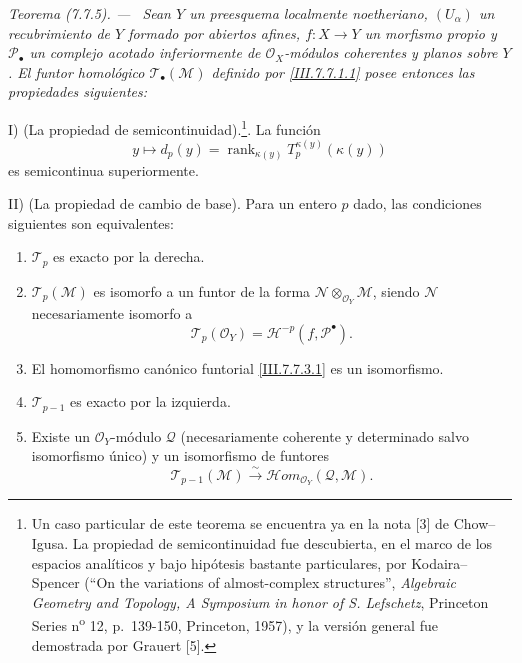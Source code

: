 \documentclass[10pt,oneside]{book}
\newcommand{\kres}{\kappa}
\newcommand{\oldpage}[2][]{\setcounter{footnote}{0}\marginpar{\scriptsize\textbf{#1}~|~#2}\ignorespaces}
\newenvironment{theorem}[1][]{\par\medskip\noindent\itshape Teorema (#1). ---\ }{\par}
\begin{document}
\begin{theorem}[7.7.5]
\label{III.7.7.5}
Sean $Y$ un preesquema localmente noetheriano, $(U_\alpha)$ un recubrimiento
de $Y$ formado por abiertos afines, $f:X\to Y$ un morfismo propio y
$\mathscr P_\bullet$ un complejo acotado inferiormente de
$\mathscr O_X$-módulos coherentes y planos sobre $Y$. El funtor homológico
$\mathscr T_\bullet(\mathscr M)$ definido por \eqref{III.7.7.1.1} posee
entonces las propiedades siguientes:

\medskip
\noindent
\textnormal{I) (La propiedad de semicontinuidad).}\footnote{Un caso particular
de este teorema se encuentra ya en la nota [3] de Chow--Igusa. La propiedad de
semicontinuidad fue descubierta, en el marco de los espacios analíticos y bajo
hipótesis bastante particulares, por Kodaira--Spencer (``On the variations of
almost-complex structures'', \emph{Algebraic Geometry and Topology, A Symposium
in honor of S. Lefschetz}, Princeton Series n\textsuperscript{o} 12,
p.~139-150, Princeton, 1957), y la versión general fue demostrada por Grauert
[5].}.
La función
\[
  y\longmapsto
  d_p(y)
  =
  \operatorname{rank}_{\kres(y)}
    T_p^{\kres(y)}(\kres(y))
  \tag{7.7.5.1}\label{III.7.7.5.1}
\]
es semicontinua superiormente.

\oldpage[III]{200}
\medskip
\noindent
\textnormal{II) (La propiedad de cambio de base).}
Para un entero $p$ dado, las condiciones siguientes son equivalentes:
\begin{enumerate}
  \item[\textup{a)}] $\mathscr T_p$ es exacto por la derecha.

  \item[\textup{a$'$)}] $\mathscr T_p(\mathscr M)$ es isomorfo a un funtor de la forma
    $\mathscr N\otimes_{\mathscr O_Y}\mathscr M$, siendo $\mathscr N$
    necesariamente isomorfo a
    \[
      \mathscr T_p(\mathscr O_Y)
      =
      \mathscr H^{-p}(f,\mathscr P^\bullet).
    \]

  \item[\textup{a$''$)}] El homomorfismo canónico funtorial
    \eqref{III.7.7.3.1} es un isomorfismo.

  \item[\textup{b)}] $\mathscr T_{p-1}$ es exacto por la izquierda.

  \item[\textup{b$'$)}] Existe un $\mathscr O_Y$-módulo $\mathscr Q$ (necesariamente
    coherente y determinado salvo isomorfismo único) y un isomorfismo de
    funtores
    \[
      \mathscr T_{p-1}(\mathscr M)
      \xrightarrow{\sim}
      \mathscr{H}\!om_{\mathscr O_Y}(\mathscr Q,\mathscr M).
      \tag{7.7.5.2}\label{III.7.7.5.2}
    \]


\end{enumerate}
\end{theorem}
\end{document}
